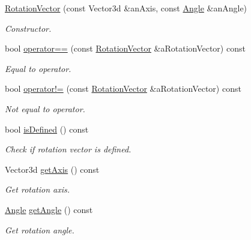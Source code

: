 \begin{DoxyCompactItemize}
\item 
\hyperlink{classlibrary_1_1math_1_1geom_1_1trf_1_1rot_1_1_rotation_vector_a32b1fab5e81bc24d777324daf5849205}{Rotation\+Vector} (const Vector3d \&an\+Axis, const \hyperlink{classlibrary_1_1math_1_1geom_1_1_angle}{Angle} \&an\+Angle)
\begin{DoxyCompactList}\small\item\em Constructor. \end{DoxyCompactList}\item 
bool \hyperlink{classlibrary_1_1math_1_1geom_1_1trf_1_1rot_1_1_rotation_vector_abccc9155d16c64e0e079d64419f489bf}{operator==} (const \hyperlink{classlibrary_1_1math_1_1geom_1_1trf_1_1rot_1_1_rotation_vector}{Rotation\+Vector} \&a\+Rotation\+Vector) const
\begin{DoxyCompactList}\small\item\em Equal to operator. \end{DoxyCompactList}\item 
bool \hyperlink{classlibrary_1_1math_1_1geom_1_1trf_1_1rot_1_1_rotation_vector_a2fdd75f9cf902bad02ba57b85e754490}{operator!=} (const \hyperlink{classlibrary_1_1math_1_1geom_1_1trf_1_1rot_1_1_rotation_vector}{Rotation\+Vector} \&a\+Rotation\+Vector) const
\begin{DoxyCompactList}\small\item\em Not equal to operator. \end{DoxyCompactList}\item 
bool \hyperlink{classlibrary_1_1math_1_1geom_1_1trf_1_1rot_1_1_rotation_vector_a4123de2991fa1f5df0745a1e6b87d959}{is\+Defined} () const
\begin{DoxyCompactList}\small\item\em Check if rotation vector is defined. \end{DoxyCompactList}\item 
Vector3d \hyperlink{classlibrary_1_1math_1_1geom_1_1trf_1_1rot_1_1_rotation_vector_aa48533e0801b1b190dfe51bf94f1a9ab}{get\+Axis} () const
\begin{DoxyCompactList}\small\item\em Get rotation axis. \end{DoxyCompactList}\item 
\hyperlink{classlibrary_1_1math_1_1geom_1_1_angle}{Angle} \hyperlink{classlibrary_1_1math_1_1geom_1_1trf_1_1rot_1_1_rotation_vector_acdf847eca416fae6725c74f7676d5c27}{get\+Angle} () const
\begin{DoxyCompactList}\small\item\em Get rotation angle. \end{DoxyCompactList}\end{DoxyCompactItemize}
